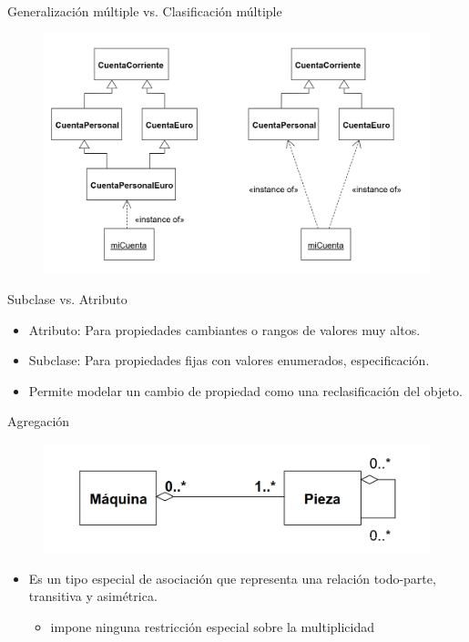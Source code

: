 \documentclass[12pt, twoside, openright]{report} %
\begin{document}
	Generalización múltiple vs. Clasificación múltiple
	\begin{figure}[H]
		{\includegraphics[scale=.2]{Untitled 25.png}}
	\end{figure}

	Subclase vs. Atributo

    \begin{itemize}
    
    \item
      Atributo: Para propiedades cambiantes o rangos de valores muy
      altos.
    \item
      Subclase: Para propiedades fijas con valores enumerados,
      especificación.
    \item
      Permite modelar un cambio de propiedad como una reclasificación
      del objeto.
    \end{itemize}

	Agregación    \vspace{-0.5cm}

	\begin{figure}[H]
		{\includegraphics[scale=.2]{Untitled 26.png}}
	\end{figure}
    \begin{itemize}
    \vspace{-0.5cm}
    \item
      Es un tipo especial de asociación que representa una relación
      todo-parte, transitiva y asimétrica.

      \begin{itemize}
      
      \item
        impone ninguna restricción especial sobre la multiplicidad
      \end{itemize}
    \end{itemize}
\end{document}
